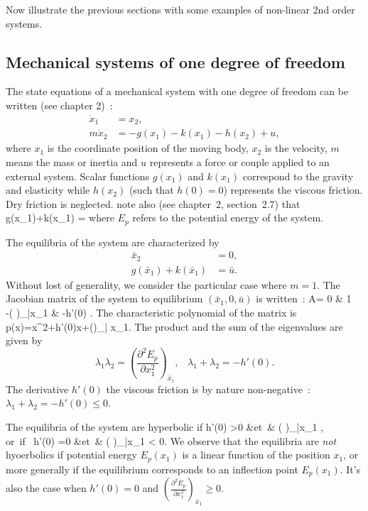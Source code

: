 Now illustrate the previous sections with some examples of non-linear 2nd order systems.



\subsection{Mechanical systems of one degree of
freedom}

The state equations of a mechanical system with one degree of freedom can be written (see chapter 2)~:
\begin{align*}
\dot x_1&=x_2,\\
m\dot x_2&=-g(x_1) -k(x_1)-h(x_2) + u,
\end{align*}
where $x_1$ 
is the coordinate position of the moving body, $x_2$ is the velocity, $m$ means the mass or inertia and $u$ represents a force or couple applied to an external system. Scalar functions $g(x_1)$ and $k(x_1)$ 
correspond to the gravity and elasticity while $h(x_2)$ (such that $h(0)=0$) represents the viscous friction. Dry friction is neglected. note also (see chapter~2, section~2.7) that 
\eqnn
g(x_1)+k(x_1) = 
\eeqnn
where $E_p$ refers to the potential energy of the system. 

The equilibria of the system are characterized by
\begin{align*}
\bar x_2 &= 0,\\
g(\bar x_1)+k(\bar x_1) &= \bar u.
\end{align*}
Without lost of generality, we consider the particular case where $m=1$. 
The Jacobian matrix of the system to equilibrium $(\bar x_1, 0,\bar
u)$ is written~: 
\eqnn
 A= 0 & 1\\-\left (\right
)_{\bar x_1} & -h'(0) \ema.
\eeqnn
The characteristic polynomial of the matrix is
\eqnn
p(x)=x^2+h'(0)x+\left (\right )_{\bar
x_1}.
\eeqnn
 The product and the sum of the eigenvalues are given by
$$ \lambda_1\lambda_2=\left (\frac{\partial^2E_p}{\partial x_1^2}\right
)_{\bar x_1}, \;\;\; \lambda_1+\lambda_2=-h'(0).$$
The derivative $h'(0)$ the viscous friction is by nature non-negative~: $\lambda_1+\lambda_2 =-h'(0) \leq 0$.




The equilibria of the system are hyperbolic if
 \eqnn 
h'(0) >0 &\mbox{et }&  \left (\right
)_{\bar x_1} ,\\
 \mbox{or if }  h'(0) =0 &\mbox{et }& \left (\right
)_{\bar x_1} < 0.
\eeqnn
We observe that the equilibria are {\em not } hyoerbolics if potential energy $E_p(x_1)$ is a linear function of the position $x_1$, or more generally if the equilibrium corresponds to an inflection point $E_p(x_1)$. It's also the case when $h'(0)=0$ and $\left (\frac{\partial^2E_p}{\partial
x_1^2}\right )_{\bar x_1} \geq 0$.

